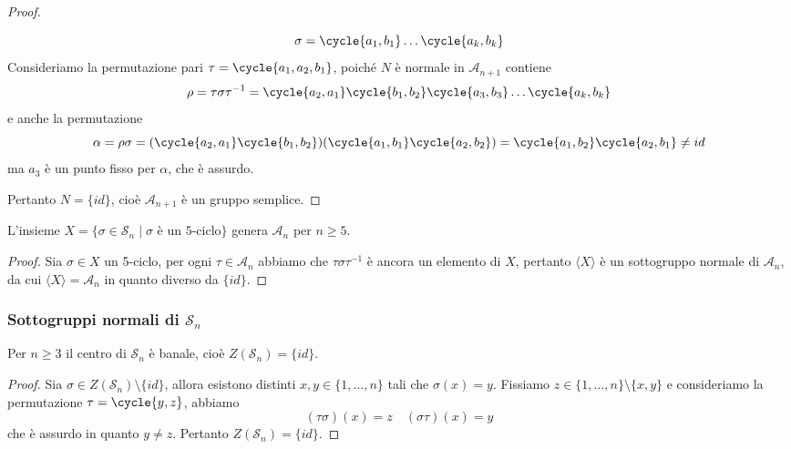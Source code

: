 \documentclass[11pt]{scrartcl}
\begin{document}
\begin{proof}
\begin{itemize}
        \[
            \sigma = \cycle{a_1, b_1}\ldots\cycle{a_k, b_k}
        \]
        Consideriamo la permutazione pari $\tau = \cycle{a_1, a_2, b_1}$,
        poiché $N$ è normale in $\mathcal{A}_{n + 1}$ contiene
        \[
            \rho = \tau\sigma\tau^{-1} = \cycle{a_2, a_1}\cycle{b_1, b_2}
            \cycle{a_3, b_3}\ldots\cycle{a_k, b_k}
        \]
        e anche la permutazione 
        \[
            \alpha = \rho\sigma = (\cycle{a_2, a_1}\cycle{b_1, b_2})
            (\cycle{a_1, b_1}\cycle{a_2, b_2}) = \cycle{a_1, b_2}\cycle{a_2, b_1} \neq id
        \]
        ma $a_3$ è un punto fisso per $\alpha$, che è assurdo.
    \end{itemize}
    Pertanto $N = \{id\}$, cioè $\mathcal{A}_{n + 1}$ è un gruppo semplice.
\end{proof}

\begin{corollary}
    L'insieme $X = \{\sigma \in \mathcal{S}_n\mid \sigma \text{ è un 5-ciclo}\}$ genera
    $\mathcal{A}_n$ per $n \geqslant 5$.
\end{corollary}

\begin{proof}
    Sia $\sigma \in X$ un 5-ciclo, per ogni $\tau \in \mathcal{A}_n$
    abbiamo che $\tau\sigma\tau^{-1}$ è ancora un elemento di $X$, pertanto
    $\langle X\rangle$ è un sottogruppo normale di $\mathcal{A}_n$, da cui 
    $\langle X \rangle = \mathcal{A}_n$ in quanto diverso da $\{id\}$.
\end{proof}


\subsubsection{Sottogruppi normali di $\mathcal{S}_n$}

\begin{lemma}
    \label{lemma1.65}
    Per $n \geq 3$ il centro di $\mathcal{S}_n$ è banale, cioè $Z(\mathcal{S}_n) = \{id\}$.
\end{lemma}

\begin{proof}
    Sia $\sigma \in Z(\mathcal{S}_n) \setminus \{id\}$, allora esistono distinti 
    $x, y \in \{1, \ldots, n\}$ tali che $\sigma(x) = y$. Fissiamo 
    $z \in \{1, \ldots, n\}\setminus \{x, y\}$ e consideriamo la permutazione
    $\tau = \cycle{y, z}$, abbiamo
    \[
        (\tau\sigma)(x) = z \quad (\sigma\tau)(x) = y
    \]
    che è assurdo in quanto $y \neq z$. Pertanto $Z(\mathcal{S}_n) = \{id\}$.
\end{proof}
\end{document}
